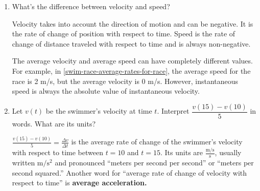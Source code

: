 \documentclass{article}
\begin{document}
\begin{enumerate}
\begin{enumerate}
  \item \label{swim-race-velocity-vs-speed}


    \begin{problem}[\vfill]
      What's the difference between velocity and speed?
    \end{problem}

    \begin{solution}
      Velocity takes into account the direction of motion and can be negative. It is the
      rate of change of position with respect to time. 
      Speed is the rate of change of distance
      traveled with respect to time and is always non-negative.
      
      The average velocity and average speed can have completely different values. For example, in
      \ref{swim-race-average-rates-for-race}, the average speed for the race is 2 m/s, but the average
      velocity is 0 m/s. However, instantaneous speed is always the absolute value of
      instantaneous velocity.
    \end{solution}

  \item \label{swim-race-average-acceleration}


    \begin{problem}[0.5in]
      Let $v(t)$ be the swimmer's velocity at time $t$. Interpret
      $\dfrac{v(15) - v(10)}{5}$ in words. What are its units?
    \end{problem}

    \begin{solution}
        $\frac{v(15)-v(10)}{5}=\frac{\Delta v}{\Delta t}$ is the average rate of change of
        the swimmer's velocity with respect to time between $t=10$ and $t=15$. Its units are 
        $\frac{\text{m/s}}{\text{s}}$, usually written $\text{m/s$^2$}$ and pronounced 
        ``meters per second per second'' or ``meters per second squared.''
        Another word for ``average rate of change of velocity with respect to time'' is 
        \textbf{average acceleration.}
    \end{solution}

  \end{enumerate}


\end{enumerate}
\end{document}
